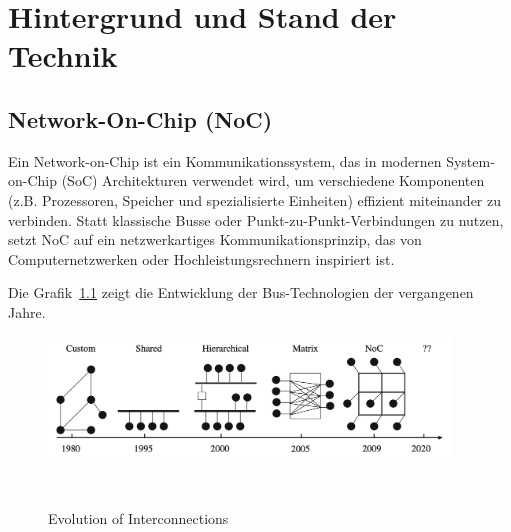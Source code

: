 \chapter{Hintergrund und Stand der Technik}

\section{Network-On-Chip (NoC)}
Ein Network-on-Chip ist ein Kommunikationssystem, das in modernen System-on-Chip (SoC) Architekturen verwendet wird, um verschiedene Komponenten (z.B. Prozessoren, Speicher und spezialisierte Einheiten) effizient miteinander zu verbinden. Statt klassische Busse oder Punkt-zu-Punkt-Verbindungen zu nutzen, setzt NoC auf ein netzwerkartiges Kommunikationsprinzip, das von Computernetzwerken oder Hochleistungsrechnern inspiriert ist. 

Die Grafik~\ref{fig:Evolution_of_Interconnection} zeigt die Entwicklung der Bus-Technologien der vergangenen Jahre.
\begin{figure}[htbp]
    \centering
    \includegraphics[width=0.95\textwidth]{img/Evolution of On-Chip communication interconnect.png}
    \caption{Evolution of Interconnections}~\cite{BenAbdallah2013}  \label{fig:Evolution_of_Interconnection}
\end{figure}

